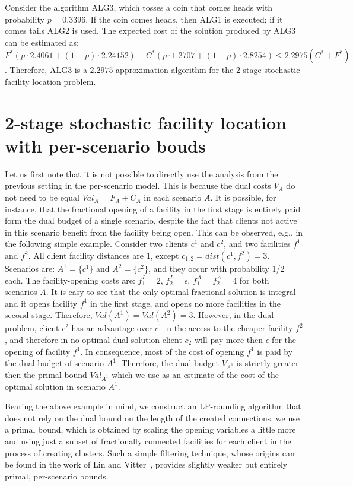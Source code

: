 \documentclass[11pt]{article}
\begin{document}
Consider the algorithm ALG3, which tosses a coin that comes heads with probability $p=0.3396$.
If the coin comes heads, then ALG1 is executed; if it comes tails ALG2 is used.
The expected cost of the solution produced by ALG3 can be estimated as: $ F^* (p \cdot 2.4061 + (1-p)\cdot 2.24152) + 
C^*(p \cdot 1.2707 + (1-p)\cdot 2.8254) \leq 2.2975 (C^*+F^*)$.
Therefore, ALG3 is a $2.2975$-approximation algorithm for the 2-stage stochastic facility location problem.

\section{2-stage stochastic facility location with per-scenario bouds}
\label{app:per-scenario}

Let us first note that it is not possible to directly use the analysis from
the previous setting in the per-scenario model. This is because the dual costs $V_A$
do not need to be equal $Val_A = F_A + C_A$ in each scenario $A$. It is possible, for instance,
that the fractional opening of a facility in the first stage is entirely paid 
form the dual budget of a single scenario, despite the fact that clients not active
in this scenario benefit from the facility being open. This can be observed, e.g., in the following
simple example. 
Consider two clients $c^1$ and $c^2$, and two facilities $f^1$ and $f^2$.
All client facility distances are 1, except $c_{1,2}=dist(c^1,f^2)=3$.
Scenarios are: $A^1 = \{c^1\}$ and $A^2=\{c^2\}$, and they occur with probability 1/2 each.
The facility-opening costs are: $f_1^I=2$, $f_2^I=\epsilon$, $f_1^A=f_2^A=4$ for both scenarios $A$. 
It is easy to see that the only optimal fractional solution is integral
and it opens facility $f^1$ in the first stage, and opens no more facilities
in the second stage. Therefore, $Val(A^1)=Val(A^2)=3$.
However, in the dual problem, client $c^2$ has an advantage over $c^1$ in the access 
to the cheaper facility $f^2$, and therefore in no optimal dual solution client $c_2$ will pay
more then $\epsilon$ for the opening of facility $f^1$. In consequence, most of the cost of opening $f^1$
is paid by the dual budget of scenario $A^1$. Therefore, the dual budget $V_{A^1}$ 
is strictly greater then the primal bound $Val_{A^1}$ which we use as an estimate
of the cost of the optimal solution in scenario $A^1$.

Bearing the above example in mind, we construct an LP-rounding algorithm
that does not rely on the dual bound on the length of the created connections.
we use a primal bound, which is obtained by scaling the opening variables a little more
and using just a subset of fractionally connected facilities for each client
in the process of creating clusters. Such a simple filtering technique,
whose origins can be found in the work of Lin and Vitter~\cite{DBLP:conf/stoc/LinV92}, provides slightly weaker
but entirely primal, per-scenario bounds.
\end{document}
